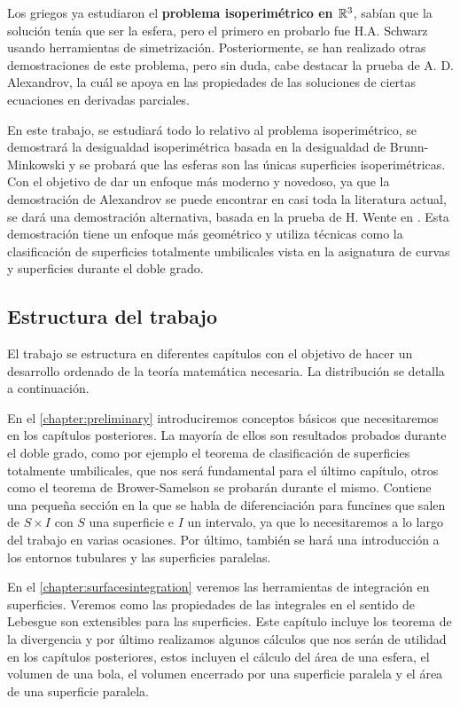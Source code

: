 Los griegos ya estudiaron el \textbf{problema isoperimétrico en $\mathbb{R}^3$}, sabían que la solución tenía que ser la esfera, pero el primero en probarlo fue H.A. Schwarz usando herramientas de simetrización. Posteriormente, se han realizado otras demostraciones de este problema, pero sin duda, cabe destacar la prueba de A. D. Alexandrov, la cuál se apoya en las propiedades de las soluciones de ciertas ecuaciones en derivadas parciales.

En este trabajo, se estudiará todo lo relativo al problema isoperimétrico, se demostrará la desigualdad isoperimétrica basada en la desigualdad de Brunn-Minkowski y se probará que las esferas son las únicas superficies isoperimétricas. Con el objetivo de dar un enfoque más moderno y novedoso, ya que la demostración de Alexandrov se puede encontrar en casi toda la literatura actual, se dará una demostración alternativa, basada en la prueba de H. Wente en \cite{wenteproof}. Esta demostración tiene un enfoque más geométrico y utiliza técnicas como la clasificación de superficies totalmente umbilicales vista en la asignatura de curvas y superficies durante el doble grado.

\subsection{Estructura del trabajo}

El trabajo se estructura en diferentes capítulos con el objetivo de hacer un desarrollo ordenado de la teoría matemática necesaria. La distribución se detalla a continuación.

En el \autoref{chapter:preliminary} introduciremos conceptos básicos que necesitaremos en los capítulos posteriores. La mayoría de ellos son resultados probados durante el doble grado, como por ejemplo el teorema de clasificación de superficies totalmente umbilicales, que nos será fundamental para el último capítulo, otros como el teorema de Brower-Samelson se probarán durante el mismo. Contiene una pequeña sección en la que se habla de diferenciación para funcines que salen de $S\times I$ con $S$ una superficie e $I$ un intervalo, ya que lo necesitaremos a lo largo del trabajo en varias ocasiones. Por último, también se hará una introducción a los entornos tubulares y las superficies paralelas.

En el \autoref{chapter:surfacesintegration} veremos las herramientas de integración en superficies. Veremos como las propiedades de las integrales en el sentido de Lebesgue son extensibles para las superficies. Este capítulo incluye los teorema de la divergencia y por último realizamos algunos cálculos que nos serán de utilidad en los capítulos posteriores, estos incluyen el cálculo del área de una esfera, el volumen de una bola, el volumen encerrado por una superficie paralela y el área de una superficie paralela.

